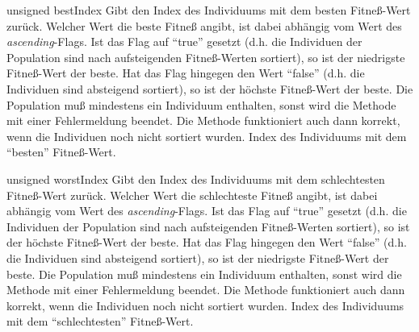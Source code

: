 \documentclass{report}
\begin{document}
\vspace{4ex}

\setConstInstance
\printEmptyMethodReturn
{unsigned}
{bestIndex}
{Gibt den Index des Individuums mit dem besten Fitne{\ss}-Wert zur\"uck. 
    Welcher Wert die beste Fitne{\ss} angibt, ist dabei abh\"angig vom Wert
    des {\em ascending}-Flags. Ist das Flag auf ``true'' gesetzt (d.h. die Individuen
    der Population sind nach aufsteigenden Fitne{\ss}-Werten sortiert), so ist der
    niedrigste Fitne{\ss}-Wert der beste. Hat das Flag hingegen den Wert
    ``false''
    (d.h. die Individuen sind absteigend sortiert), so ist der h\"ochste 
    Fitne{\ss}-Wert der beste. Die Population mu{\ss} mindestens ein Individuum 
    enthalten, sonst wird die Methode mit einer Fehlermeldung 
    beendet. Die Methode funktioniert auch dann korrekt, wenn die Individuen noch nicht 
    sortiert wurden.}
{Index des Individuums mit dem ``besten'' Fitne{\ss}-Wert.}

\vspace{4ex}

\setConstInstance
\printEmptyMethodReturn
{unsigned}
{worstIndex}
{Gibt den Index des Individuums mit dem schlechtesten Fitne{\ss}-Wert 
 zur\"uck. 
    Welcher Wert die schlechteste Fitne{\ss} angibt, ist dabei abh\"angig vom Wert
    des {\em ascending}-Flags. Ist das Flag auf ``true'' gesetzt (d.h. die Individuen
    der Population sind nach aufsteigenden Fitne{\ss}-Werten sortiert), so ist der
    h\"ochste Fitne{\ss}-Wert der beste. Hat das Flag hingegen den Wert
    ``false''
    (d.h. die Individuen sind absteigend sortiert), so ist der niedrigste
    Fitne{\ss}-Wert der beste. Die Population mu{\ss} mindestens ein Individuum 
    enthalten, sonst wird die Methode mit einer Fehlermeldung 
    beendet. Die Methode funktioniert auch dann korrekt, wenn die Individuen noch nicht 
    sortiert wurden.}
{Index des Individuums mit dem ``schlechtesten'' Fitne{\ss}-Wert.}

\newpage
\end{document}
